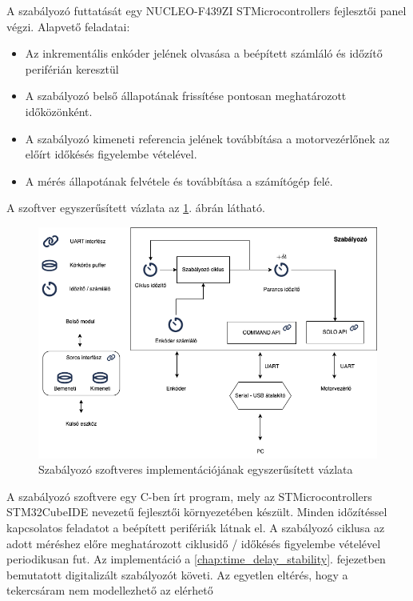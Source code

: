 A szabályozó futtatását egy NUCLEO-F439ZI STMicrocontrollers fejlesztői panel végzi.
Alapvető feladatai:
\begin{itemize}
    \item Az inkrementális enkóder jelének olvasása a beépített számláló és időzítő periférián keresztül
    \item A szabályozó belső állapotának frissítése pontosan meghatározott időközönként.
    \item A szabályozó kimeneti referencia jelének továbbítása a motorvezérlőnek az előírt időkésés figyelembe vételével.
    \item A mérés állapotának felvétele és továbbítása a számítógép felé.
\end{itemize}
A szoftver egyszerűsített vázlata az \ref{fig:block_diagram_control_software}. ábrán látható. 
\begin{figure}[H]
    \begin{center}
    \includegraphics[width=14cm]{images/impedance_controler_software_diagram.png}
    \caption{Szabályozó szoftveres implementációjának egyszerűsített vázlata}\label{fig:block_diagram_control_software}
    \end{center}
\end{figure}
A szabályozó szoftvere egy C-ben írt program, mely az STMicrocontrollers STM32CubeIDE nevezetű 
fejlesztői környezetében készült. Minden időzítéssel kapcsolatos feladatot a beépített perifériák 
látnak el. A szabályozó ciklusa az adott méréshez előre meghatározott ciklusidő / időkésés figyelembe 
vételével periodikusan fut. Az implementáció a \ref{chap:time_delay_stability}. fejezetben bemutatott 
digitalizált szabályozót követi. Az egyetlen eltérés, hogy a tekercsáram nem modellezhető az elérhető 
